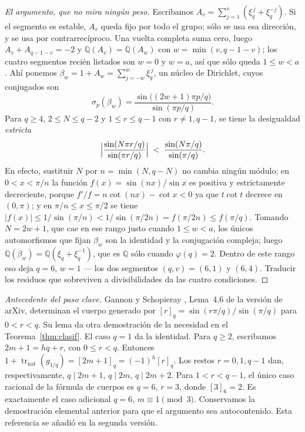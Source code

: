 \documentclass[11pt,a4paper]{article}
\begin{document}
\begin{proof}[El argumento, que no mira ningún peso]
Escribamos $A_v=\sum_{j=1}^{v}(\xi_q^{\,j}+\xi_q^{-j})$. Si el segmento es estable, $A_v$ queda
fijo por todo el grupo; sólo se usa esa dirección, y se usa por contrarrecíproco. Una vuelta completa suma cero, luego
$A_v+A_{q-1-v}=-2$ y $\mathbb{Q}(A_v)=\mathbb{Q}(A_w)$ con $w=\min(v,q-1-v)$; los cuatro segmentos
recién listados son $w=0$ y $w=a$, así que sólo queda $1\le w<a$. Ahí ponemos
$\beta_w=1+A_w=\sum_{j=-w}^{w}\xi_q^{\,j}$, un núcleo de Dirichlet, cuyos conjugados son
\[
  \sigma_p(\beta_w)=\frac{\sin\bigl((2w+1)\pi p/q\bigr)}{\sin(\pi p/q)} .
\]
Para $q\ge4$, $2\le N\le q-2$ y $1\le r\le q-1$ con $r\neq1,q-1$, se tiene la desigualdad
\emph{estricta}
\[
  \Bigl|\frac{\sin(N\pi r/q)}{\sin(\pi r/q)}\Bigr|
  \;<\;\frac{\sin(N\pi/q)}{\sin(\pi/q)} .
\]
En efecto, sustituir $N$ por $n=\min(N,q-N)$ no cambia ningún módulo; en $0<x<\pi/n$ la función
$f(x)=\sin(nx)/\sin x$ es positiva y estrictamente decreciente, porque $f'/f=n\cot(nx)-\cot x<0$ ya
que $t\cot t$ decrece en $(0,\pi)$; y en $\pi/n\le x\le\pi/2$ se tiene
$|f(x)|\le 1/\sin(\pi/n)<1/\sin(\pi/2n)=f(\pi/2n)\le f(\pi/q)$. Tomando $N=2w+1$, que cae en ese
rango justo cuando $1\le w<a$, los únicos automorfismos que fijan $\beta_w$ son la identidad y la
conjugación compleja; luego $\mathbb{Q}(\beta_w)=\mathbb{Q}(\xi_q+\xi_q^{-1})$, que es
$\mathbb{Q}$ sólo cuando $\varphi(q)=2$. Dentro de este rango eso deja $q=6$, $w=1$ --- los dos
segmentos $(q,v)=(6,1)$ y $(6,4)$. Traducir los residuos que sobreviven a divisibilidades da las
cuatro condiciones.
\end{proof}

\noindent\emph{Antecedente del paso clave.} Gannon y Schopieray \cite{GS19}, Lema~4.6 de la versión de arXiv, determinan el cuerpo generado por $[r]_q=\sin(r\pi/q)/\sin(\pi/q)$ para $0<r<q$. Su lema da otra demostración de la necesidad en el Teorema~\ref{thm:clasif}. El caso $q=1$ da la identidad. Para $q\ge2$, escribamos $2m+1=hq+r$, con $0\le r<q$. Entonces $1+\operatorname{tr}_{\mathrm{nat}}(g_{1/q})=[2m+1]_q=(-1)^h[r]_q$. Los restos $r=0,1,q-1$ dan, respectivamente, $q\mid 2m+1$, $q\mid 2m$, $q\mid 2m+2$. Para $1<r<q-1$, el único caso racional de la fórmula de cuerpos es $q=6$, $r=3$, donde $[3]_6=2$. Es exactamente el caso adicional $q=6$, $m\equiv1\pmod3$. Conservamos la demostración elemental anterior para que el argumento sea autocontenido. Esta referencia se añadió en la segunda versión.
\end{document}
